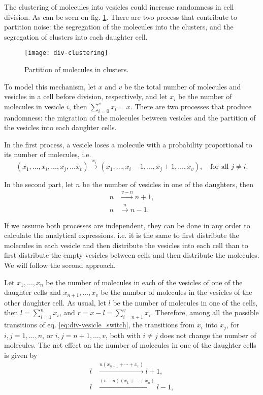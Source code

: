 The clustering of molecules into vesicles could increase randomness in cell division. As can be seen on fig. \ref{fig:div-clustering}. There are two process that contribute to partition noise: the segregation of the molecules into the clusters, and the segregation of clusters into each daughter cell.
\begin{figure}[H]
  \centering
  \texttt{[image: div-clustering]}
  \caption[Partition of molecules in clusters]{\label{fig:div-clustering} Partition of molecules in clusters.}
\end{figure}

To model this mechanism, let $x$ and $v$ be the total number of molecules and vesicles in a cell before division, respectively, and let $x_i$ be the number of molecules in vesicle $i$, then $\sum_{i=0}^vx_i=x$. There are two processes that produce randomness: the migration of the molecules between vesicles and the partition of the vesicles into each daughter cells.

In the first process, a vesicle loses a molecule with a probability proportional to its number of molecules, i.e.
\begin{equation}
  \label{eq:div-vesicle_switch}
  (x_1,\dotsc,x_i,\dotsc,x_j,\dotsc x_v) \xrightarrow{x_i} (x_1,\dotsc,x_i-1,\dotsc,x_j+1,\dotsc, x_v),\quad \text{for all } j\neq i.
\end{equation}

In the second part, let $n$ be the number of vesicles in one of the daughters, then
\begin{equation}
  \label{eq:div-arr_clust}
  \begin{split}
    n &\xrightarrow{v-n} n+1,\\
    n &\xrightarrow{n} n-1.
  \end{split}
\end{equation}

If we assume both processes are independent, they can be done in any order to calculate the analytical expressions. i.e. it is the same to first distribute the molecules in each vesicle and then distribute the vesicles into each cell than to first distribute the empty vesicles between cells and then distribute the molecules. We will follow the second approach.

Let $x_1,\dotsc,x_n$ be the number of molecules in each of the vesicles of one of the daughter cells and $x_{n+1},\dotsc,x_v$ be the number of molecules in the vesicles of the other daughter cell. As usual, let $l$ be the number of molecules in one of the cells, then $l = \sum_{i=1}^nx_i$, and $r = x-l = \sum_{i=n+1}^vx_i$. Therefore, among all the possible transitions of eq. \eqref{eq:div-vesicle_switch}, the transitions from $x_i$ into $x_j$, for $i,j=1,\dotsc,n$, or $i,j=n+1,\dotsc,v$, both with $i\neq j$ does not change the number of molecules. The net effect on the number of molecules in one of the daughter cells is given by
\begin{equation*}
  \begin{split}
    l&\xrightarrow{n(x_{n+1}+\dotsb+x_{v})}l+1,\\
    l&\xrightarrow{(v-n)(x_1+\dotsb+x_n)}l-1,
  \end{split}
\end{equation*}

